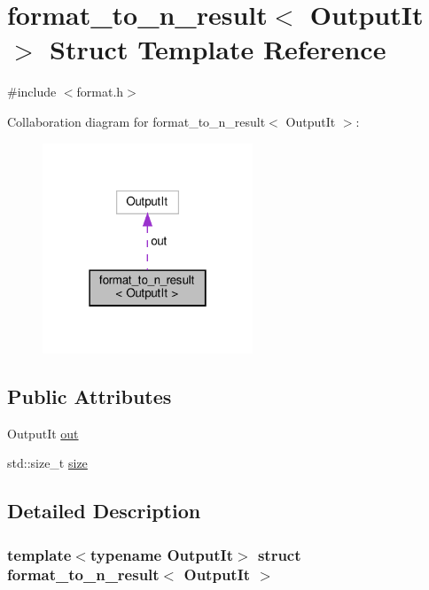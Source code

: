 \hypertarget{structformat__to__n__result}{}\section{format\+\_\+to\+\_\+n\+\_\+result$<$ Output\+It $>$ Struct Template Reference}
\label{structformat__to__n__result}


{\ttfamily \#include $<$format.\+h$>$}



Collaboration diagram for format\+\_\+to\+\_\+n\+\_\+result$<$ Output\+It $>$\+:
\nopagebreak
\begin{figure}[H]
\begin{center}
\leavevmode
\includegraphics[width=178pt]{structformat__to__n__result__coll__graph}
\end{center}
\end{figure}
\subsection*{Public Attributes}
\begin{DoxyCompactItemize}
\item 
Output\+It \hyperlink{structformat__to__n__result_a90597c6c1d23c7301aef16e756c6263b}{out}
\item 
std\+::size\+\_\+t \hyperlink{structformat__to__n__result_a5d0924cddcfab39a1c38ff0e75cbe5bf}{size}
\end{DoxyCompactItemize}


\subsection{Detailed Description}
\subsubsection*{template$<$typename Output\+It$>$\newline
struct format\+\_\+to\+\_\+n\+\_\+result$<$ Output\+It $>$}



